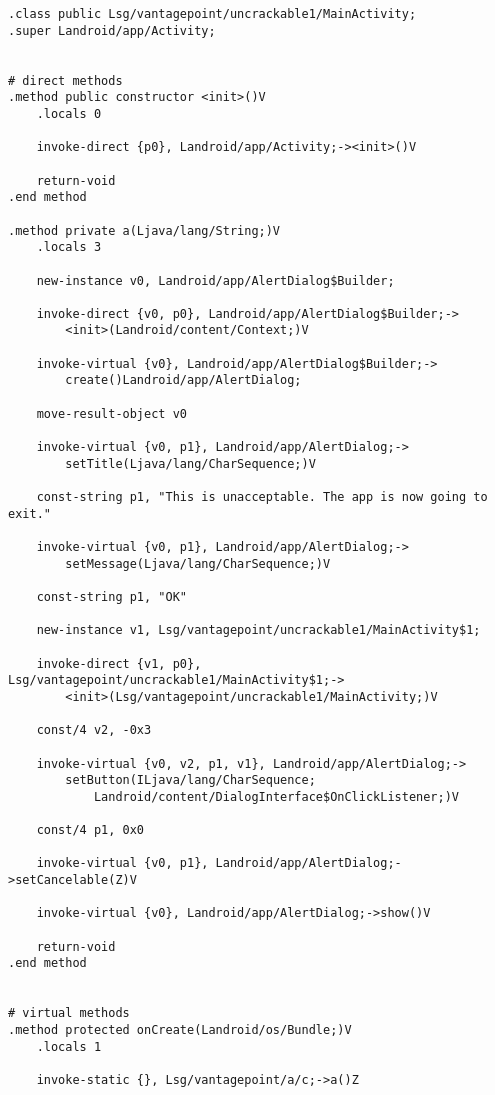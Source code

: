 \begin{verbatim}
.class public Lsg/vantagepoint/uncrackable1/MainActivity;
.super Landroid/app/Activity;


# direct methods
.method public constructor <init>()V
    .locals 0

    invoke-direct {p0}, Landroid/app/Activity;-><init>()V

    return-void
.end method

.method private a(Ljava/lang/String;)V
    .locals 3

    new-instance v0, Landroid/app/AlertDialog$Builder;

    invoke-direct {v0, p0}, Landroid/app/AlertDialog$Builder;->
        <init>(Landroid/content/Context;)V

    invoke-virtual {v0}, Landroid/app/AlertDialog$Builder;->
        create()Landroid/app/AlertDialog;

    move-result-object v0

    invoke-virtual {v0, p1}, Landroid/app/AlertDialog;->
        setTitle(Ljava/lang/CharSequence;)V

    const-string p1, "This is unacceptable. The app is now going to exit."

    invoke-virtual {v0, p1}, Landroid/app/AlertDialog;->
        setMessage(Ljava/lang/CharSequence;)V

    const-string p1, "OK"

    new-instance v1, Lsg/vantagepoint/uncrackable1/MainActivity$1;

    invoke-direct {v1, p0}, Lsg/vantagepoint/uncrackable1/MainActivity$1;->
        <init>(Lsg/vantagepoint/uncrackable1/MainActivity;)V

    const/4 v2, -0x3

    invoke-virtual {v0, v2, p1, v1}, Landroid/app/AlertDialog;->
        setButton(ILjava/lang/CharSequence;
            Landroid/content/DialogInterface$OnClickListener;)V

    const/4 p1, 0x0

    invoke-virtual {v0, p1}, Landroid/app/AlertDialog;->setCancelable(Z)V

    invoke-virtual {v0}, Landroid/app/AlertDialog;->show()V

    return-void
.end method


# virtual methods
.method protected onCreate(Landroid/os/Bundle;)V
    .locals 1

    invoke-static {}, Lsg/vantagepoint/a/c;->a()Z


\end{verbatim}
